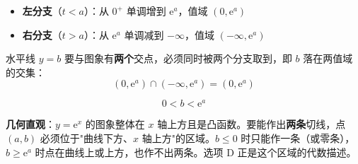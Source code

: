 \begin{answer}
\begin{itemize}
\item \textbf{左分支}（$t<a$）：从 $0^{+}$ 单调增到 $\mathrm e^{a}$，值域 $\left(0,\mathrm e^{a}\right)$
\item \textbf{右分支}（$t>a$）：从 $\mathrm e^{a}$ 单调减到 $-\infty$，值域 $\left(-\infty,\mathrm e^{a}\right)$
\end{itemize}

水平线 $y=b$ 要与图象有\textbf{两个}交点，必须同时被两个分支取到，即 $b$ 落在两值域的交集：
\nopagebreak[4]
\[\left(0,\mathrm e^{a}\right)\cap\left(-\infty,\mathrm e^{a}\right)=\left(0,\mathrm e^{a}\right)\]

\nopagebreak[4]
\[0<b<\mathrm e^{a}\]

\begin{gktip}
\textbf{几何直观}：$y=\mathrm e^{x}$ 的图象整体在 $x$ 轴上方且是凸函数。要能作出\textbf{两条}切线，点 $(a,b)$ 必须位于"曲线下方、$x$ 轴上方"的区域。$b\le0$ 时只能作一条（或零条），$b\ge\mathrm e^{a}$ 时点在曲线上或上方，也作不出两条。选项 D 正是这个区域的代数描述。
\end{gktip}


\par\medskip

\end{answer}
